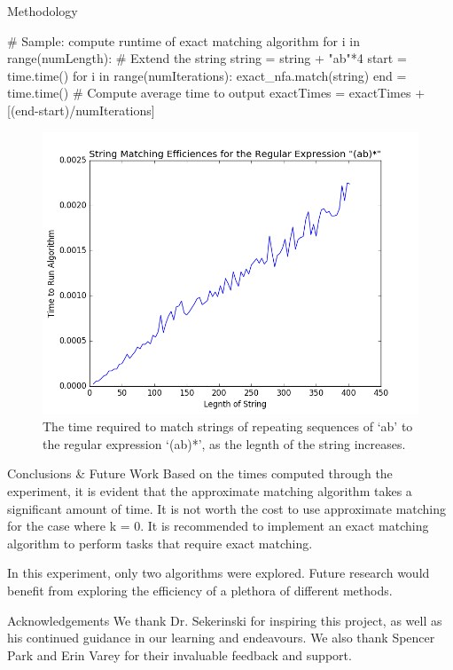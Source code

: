 \documentclass[22pt]{beamer}
\begin{document}
\begin{frame}[fragile]
\begin{textblock}{7.25}
\begin{block}{Methodology}
\begin{python}
  # Sample: compute runtime of exact matching algorithm
  for i in range(numLength):
      # Extend the string
      string = string + "ab"*4
      start = time.time()
      for i in range(numIterations):
          exact_nfa.match(string)    
      end = time.time()
      # Compute average time to output
      exactTimes = exactTimes + [(end-start)/numIterations]
\end{python}


\begin{figure}
\includegraphics[scale=1.9]{result_1.PNG}
\caption{The time required to match strings of repeating sequences of `ab' to the regular expression `(ab)*', as the legnth of the string increases.}
\end{figure}


\end{block}


\begin{block}{Conclusions \& Future Work}
Based on the times computed through the experiment, it is evident that the approximate matching algorithm takes a significant amount of time. It is not worth the cost to use approximate matching for the case where k = 0. It is recommended to implement an exact matching algorithm to perform tasks that require exact matching. 

In this experiment, only two algorithms were explored. Future research would benefit from exploring the efficiency of a plethora of different methods.
\end{block}


\begin{block}{Acknowledgements}
We thank Dr. Sekerinski for inspiring this project, as well as his continued guidance in our learning and endeavours. We also thank Spencer Park and Erin Varey for their invaluable feedback and support. 
\end{block}


\end{textblock}
\end{frame}
\end{document}

